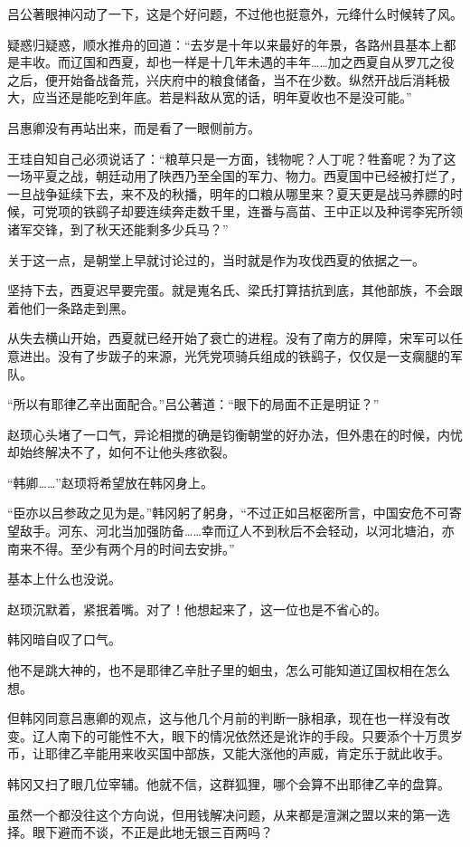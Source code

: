 吕公著眼神闪动了一下，这是个好问题，不过他也挺意外，元绛什么时候转了风。

疑惑归疑惑，顺水推舟的回道：“去岁是十年以来最好的年景，各路州县基本上都是丰收。而辽国和西夏，却也一样是十几年未遇的丰年……加之西夏自从罗兀之役之后，便开始备战备荒，兴庆府中的粮食储备，当不在少数。纵然开战后消耗极大，应当还是能吃到年底。若是料敌从宽的话，明年夏收也不是没可能。”

吕惠卿没有再站出来，而是看了一眼侧前方。

王珪自知自己必须说话了：“粮草只是一方面，钱物呢？人丁呢？牲畜呢？为了这一场平夏之战，朝廷动用了陕西乃至全国的军力、物力。西夏国中已经被打烂了，一旦战争延续下去，来不及的秋播，明年的口粮从哪里来？夏天更是战马养膘的时候，可党项的铁鹞子却要连续奔走数千里，连番与高苗、王中正以及种谔李宪所领诸军交锋，到了秋天还能剩多少兵马？”

关于这一点，是朝堂上早就讨论过的，当时就是作为攻伐西夏的依据之一。

坚持下去，西夏迟早要完蛋。就是嵬名氏、梁氏打算拮抗到底，其他部族，不会跟着他们一条路走到黑。

从失去横山开始，西夏就已经开始了衰亡的进程。没有了南方的屏障，宋军可以任意进出。没有了步跋子的来源，光凭党项骑兵组成的铁鹞子，仅仅是一支瘸腿的军队。

“所以有耶律乙辛出面配合。”吕公著道：“眼下的局面不正是明证？”

赵顼心头堵了一口气，异论相搅的确是钧衡朝堂的好办法，但外患在的时候，内忧却始终解决不了，如何不让他头疼欲裂。

“韩卿……”赵顼将希望放在韩冈身上。

“臣亦以吕参政之见为是。”韩冈躬了躬身，“不过正如吕枢密所言，中国安危不可寄望敌手。河东、河北当加强防备……幸而辽人不到秋后不会轻动，以河北塘泊，亦南来不得。至少有两个月的时间去安排。”

基本上什么也没说。

赵顼沉默着，紧抿着嘴。对了！他想起来了，这一位也是不省心的。

韩冈暗自叹了口气。

他不是跳大神的，也不是耶律乙辛肚子里的蛔虫，怎么可能知道辽国权相在怎么想。

但韩冈同意吕惠卿的观点，这与他几个月前的判断一脉相承，现在也一样没有改变。辽人南下的可能性不大，眼下的情况依然还是讹诈的手段。只要添个十万贯岁币，让耶律乙辛能用来收买国中部族，又能大涨他的声威，肯定乐于就此收手。

韩冈又扫了眼几位宰辅。他就不信，这群狐狸，哪个会算不出耶律乙辛的盘算。

虽然一个都没往这个方向说，但用钱解决问题，从来都是澶渊之盟以来的第一选择。眼下避而不谈，不正是此地无银三百两吗？


